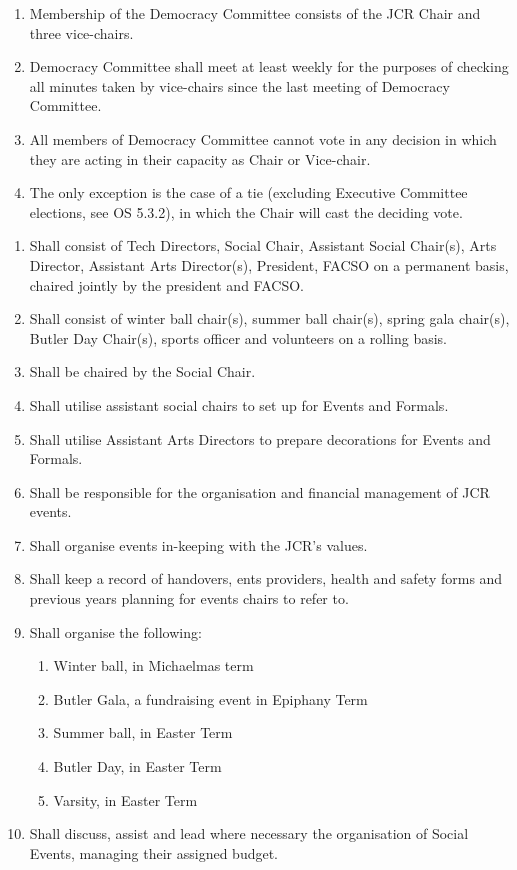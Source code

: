 
\begin{enumerate}
    \item Membership of the Democracy Committee consists of the JCR Chair and three vice-chairs.
    \item Democracy Committee shall meet at least weekly for the purposes of checking all minutes taken by vice-chairs since the last meeting of Democracy Committee.
    \item All members of Democracy Committee cannot vote in any decision in which they are acting in their capacity as Chair or Vice-chair.
    \item The only exception is the case of a tie (excluding Executive Committee elections, see OS 5.3.2), in which the Chair will cast the deciding vote.
\end{enumerate}



\begin{enumerate}
    
    \item Shall consist of Tech Directors, Social Chair, Assistant Social Chair(s), Arts Director, Assistant Arts Director(s), President, FACSO on a permanent basis, chaired jointly by the president and FACSO.
    \item Shall consist of winter ball chair(s), summer ball chair(s), spring gala chair(s), Butler Day Chair(s), sports officer and volunteers on a rolling basis.
    \item Shall be chaired by the Social Chair.
    \item Shall utilise assistant social chairs to set up for Events and Formals.
    \item Shall utilise Assistant Arts Directors to prepare decorations for Events and Formals.
    \item Shall be responsible for the organisation and financial management of JCR events. 
    \item Shall organise events in-keeping with the JCR’s values.
    \item Shall keep a record of handovers, ents providers, health and safety forms and previous years planning for events chairs to refer to.
    \item Shall organise the following:
    \begin{enumerate}
        \item Winter ball, in Michaelmas term
        \item Butler Gala, a fundraising event in Epiphany Term
        \item Summer ball, in Easter Term
        \item Butler Day, in Easter Term
        \item Varsity, in Easter Term
    \end{enumerate}
    \item Shall discuss, assist and lead where necessary the organisation of Social Events, managing their assigned budget.
   
\end{enumerate}



